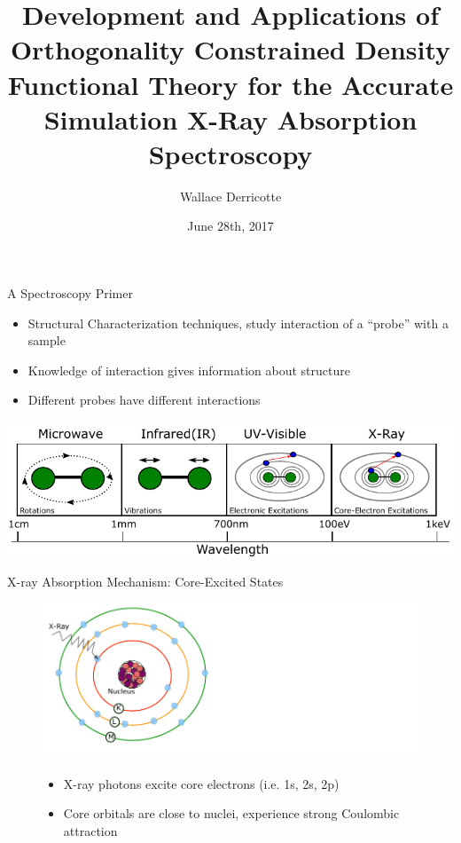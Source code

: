 \documentclass[t]{beamer}
\title[Simulating XAS in OCDFT]{Development and Applications of Orthogonality Constrained Density Functional Theory for the Accurate Simulation X-Ray Absorption Spectroscopy}
\author{Wallace Derricotte}
\institute{Dissertation Defense}
\date{June 28th, 2017}
\begin{document}

\begin{frame}
  \titlepage
\end{frame}

\begin{frame}{A Spectroscopy Primer}
\begin{itemize}
\item Structural Characterization techniques, study interaction of a ``probe'' with a sample
\item Knowledge of interaction gives information about structure
\item Different probes have different interactions
\end{itemize}
\includegraphics[width=\linewidth]{spectroscopy_primer.pdf}
\end{frame}

\begin{frame}{X-ray Absorption Mechanism: Core-Excited States}
\begin{figure}
\includegraphics[scale=0.7]{core_mechanism_1.pdf}
\begin{itemize}
\item X-ray photons excite core electrons (i.e. 1s, 2s, 2p)
\item Core orbitals are close to nuclei, experience strong Coulombic attraction
\end{itemize}
\end{figure}
\end{frame}
\end{document}
